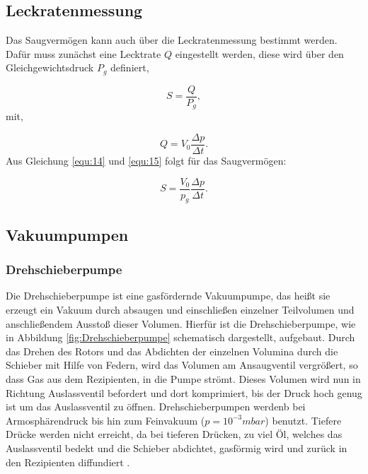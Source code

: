 \subsection{Leckratenmessung}
Das Saugvermögen kann auch über die Leckratenmessung bestimmt werden.
Dafür muss zunächst eine Lecktrate $Q$ eingestellt werden, diese wird über den Gleichgewichtsdruck $P_g$ definiert,

    \begin{equation}
    \label{equ:14}
        S = \frac{Q}{P_g},
    \end{equation}
mit,

    \begin{equation}
    \label{equ:15}
        Q = V_0 \frac{\Delta p}{\Delta t}.
    \end{equation}
Aus Gleichung \eqref{equ:14} und \eqref{equ:15} folgt für das Saugvermögen:

    \begin{equation}
    \label{equ:16}
        S = \frac{V_0}{p_g} \frac{\Delta p}{\Delta t}.
    \end{equation}
    

\subsection{Vakuumpumpen}
\subsubsection{Drehschieberpumpe}
Die Drehschieberpumpe ist eine gasfördernde Vakuumpumpe, das heißt sie erzeugt ein Vakuum durch absaugen und
einschließen einzelner Teilvolumen und anschließendem Ausstoß dieser Volumen.
Hierfür ist die Drehschieberpumpe, wie in Abbildung \ref{fig:Drehschieberpumpe} schematisch dargestellt, aufgebaut.
Durch das Drehen des Rotors und das Abdichten der einzelnen Volumina durch die Schieber mit Hilfe von Federn, 
wird das Volumen am Ansaugventil vergrößert, so dass Gas aus dem Rezipienten, in die Pumpe strömt. Dieses Volumen wird nun 
in Richtung Auslassventil befordert und dort komprimiert, bis der Druck hoch genug ist um das Auslassventil zu öffnen.
Drehschieberpumpen werdenb bei Armosphärendruck bis hin zum Feinvakuum ($p = 10^{-3} mbar$) benutzt.
Tiefere Drücke werden nicht erreicht, da bei tieferen Drücken, zu viel Öl, welches das Auslassventil bedekt und die Schieber abdichtet, 
gasförmig wird und zurück in den Rezipienten diffundiert \cite{Pfeiffer, S.60,61}. 
    
